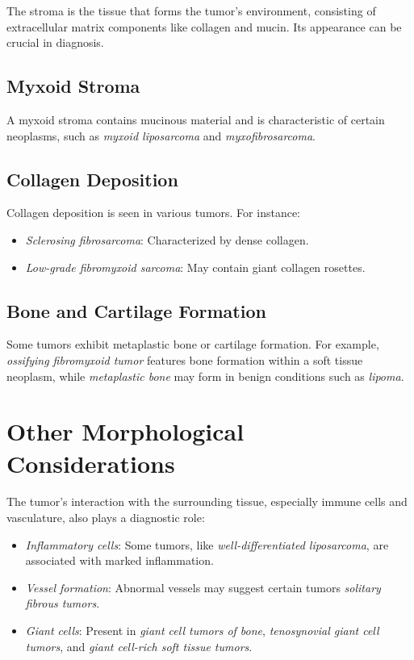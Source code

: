 The stroma is the tissue that forms the tumor's environment, consisting of extracellular matrix components like collagen and mucin. Its appearance can be crucial in diagnosis.

\subsection{Myxoid Stroma}
A myxoid stroma contains mucinous material and is characteristic of certain neoplasms, such as \emph{myxoid liposarcoma} and \emph{myxofibrosarcoma}.

\subsection{Collagen Deposition}
Collagen deposition is seen in various tumors. For instance:
\begin{itemize}
    \item \emph{Sclerosing fibrosarcoma}: Characterized by dense collagen.
    \item \emph{Low-grade fibromyxoid sarcoma}: May contain giant collagen rosettes.
\end{itemize}

\subsection{Bone and Cartilage Formation}
Some tumors exhibit metaplastic bone or cartilage formation. For example, \emph{ossifying fibromyxoid tumor} features bone formation within a soft tissue neoplasm, while \emph{metaplastic bone} may form in benign conditions such as \emph{lipoma}.

\section{Other Morphological Considerations}
The tumor's interaction with the surrounding tissue, especially immune cells and vasculature, also plays a diagnostic role:
\begin{itemize}
    \item \emph{Inflammatory cells}: Some tumors, like \emph{well-differentiated liposarcoma}, are associated with marked inflammation.
    \item \emph{Vessel formation}: Abnormal vessels may suggest certain tumors \emph{solitary fibrous tumors}.
    \item \emph{Giant cells}: Present in \emph{giant cell tumors of bone}, \emph{tenosynovial giant cell tumors}, and \emph{giant cell-rich soft tissue tumors}.
\end{itemize}

